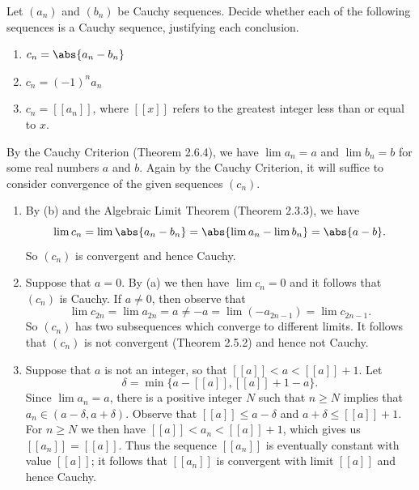 \documentclass{lew98_solutions}
\begin{document}
\begin{exercise}
\label{ex:2.6.4}
    Let \( (a_n) \) and \( (b_n) \) be Cauchy sequences. Decide whether each of the following sequences is a Cauchy sequence, justifying each conclusion.
    \begin{enumerate}
        \item \( c_n = \abs{a_n - b_n} \)

        \item \( c_n = (-1)^n a_n \)

        \item \( c_n = [[a_n]] \), where \( [[x]] \) refers to the greatest integer less than or equal to \( x \).
    \end{enumerate}
\end{exercise}

\begin{solution}
    By the Cauchy Criterion (Theorem 2.6.4), we have \( \lim a_n = a \) and \( \lim b_n = b \) for some real numbers \( a \) and \( b \). Again by the Cauchy Criterion, it will suffice to consider convergence of the given sequences \( (c_n) \).
    \begin{enumerate}
        \item By  (b) and the Algebraic Limit Theorem (Theorem 2.3.3), we have
        \[
            \lim c_n = \lim \abs{a_n - b_n} = \abs{ \lim a_n - \lim b_n} = \abs{a - b}.
        \]
        So \( (c_n) \) is convergent and hence Cauchy.

        \item Suppose that \( a = 0 \). By  (a) we then have \( \lim c_n = 0 \) and it follows that \( (c_n) \) is Cauchy. If \( a \neq 0 \), then observe that
        \[
            \lim c_{2n} = \lim a_{2n} = a \neq -a = \lim (- a_{2n-1}) = \lim c_{2n-1}.
        \]
        So \( (c_n) \) has two subsequences which converge to different limits. It follows that \( (c_n) \) is not convergent (Theorem 2.5.2) and hence not Cauchy.

        \item Suppose that \( a \) is not an integer, so that \( [[a]] < a < [[a]] + 1 \). Let
        \[
            \delta = \min \{ a - [[a]], [[a]] + 1 - a \}.
        \]
        Since \( \lim a_n = a \), there is a positive integer \( N \) such that \( n \geq N \) implies that \( a_n \in (a - \delta, a + \delta) \). Observe that \( [[a]] \leq a - \delta \) and \( a + \delta \leq [[a]] + 1 \). For \( n \geq N \) we then have \( [[a]] < a_n < [[a]] + 1 \), which gives us \( [[a_n]] = [[a]] \). Thus the sequence \( [[a_n]] \) is eventually constant with value \( [[a]] \); it follows that \( [[a_n]] \) is convergent with limit \( [[a]] \) and hence Cauchy.


\end{enumerate}
\end{solution}
\end{document}

